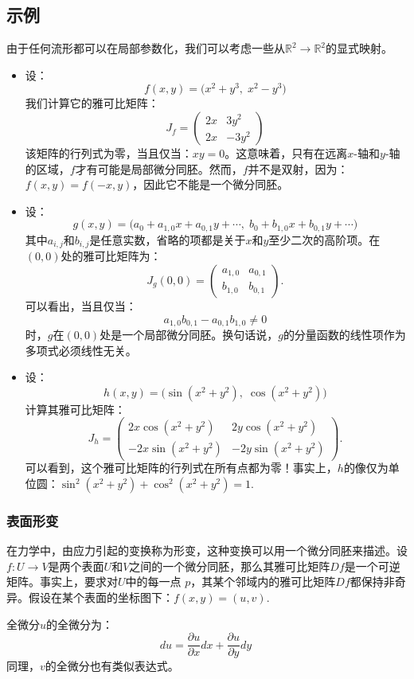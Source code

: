 \subsection{示例}
由于任何流形都可以在局部参数化，我们可以考虑一些从$\mathbb{R}^2 \to \mathbb{R}^2$的显式映射。
\begin{itemize}
\item 设：
$$
f(x, y) = \bigl(x^2 + y^3,\; x^2 - y^3 \bigr)~
$$
我们计算它的雅可比矩阵：
$$
J_f = 
\begin{pmatrix}
2x & 3y^2 \\
2x & -3y^2
\end{pmatrix}~
$$
该矩阵的行列式为零，当且仅当：$xy = 0$。这意味着，只有在远离$x$-轴和$y$-轴的区域，$f$才有可能是局部微分同胚。然而，$f$并不是双射，因为：$f(x, y) = f(-x, y)$，因此它不能是一个微分同胚。
\item 设：
$$
g(x, y) =
\bigl(
a_{0} + a_{1,0}x + a_{0,1}y + \cdots ,\;
b_{0} + b_{1,0}x + b_{0,1}y + \cdots
\bigr)~
$$
其中$a_{i,j}$和$b_{i,j}$是任意实数，省略的项都是关于$x$和$y$至少二次的高阶项。在$(0,0)$处的雅可比矩阵为：
$$
J_{g}(0,0) =
\begin{pmatrix}
a_{1,0} & a_{0,1} \\
b_{1,0} & b_{0,1}
\end{pmatrix}.~
$$
可以看出，当且仅当：
$$
a_{1,0} b_{0,1} - a_{0,1} b_{1,0} \neq 0~
$$
时，$g$在$(0,0)$处是一个局部微分同胚。换句话说，$g$的分量函数的线性项作为多项式必须线性无关。
\item 设：
$$
h(x, y) = \bigl(\sin(x^2 + y^2),\; \cos(x^2 + y^2)\bigr)~
$$
计算其雅可比矩阵：
$$
J_h =
\begin{pmatrix}
2x\cos(x^2 + y^2) & 2y\cos(x^2 + y^2)\\
-2x\sin(x^2 + y^2) & -2y\sin(x^2 + y^2)
\end{pmatrix}.~
$$
可以看到，这个雅可比矩阵的行列式在所有点都为零！事实上，$h$的像仅为单位圆：$\sin^2(x^2 + y^2) + \cos^2(x^2 + y^2) = 1$.
\end{itemize}
\subsubsection{表面形变}
在力学中，由应力引起的变换称为形变，这种变换可以用一个微分同胚来描述。设$f: U \to V$是两个表面$U$和$V$之间的一个微分同胚，那么其雅可比矩阵$Df$是一个可逆矩阵。事实上，要求对$U$中的每一点 $p$，其某个邻域内的雅可比矩阵$Df$都保持非奇异。假设在某个表面的坐标图下：$f(x, y) = (u, v)$.

全微分$u$的全微分为：
$$
du = \frac{\partial u}{\partial x} dx + \frac{\partial u}{\partial y} dy~
$$
同理，$v$的全微分也有类似表达式。

